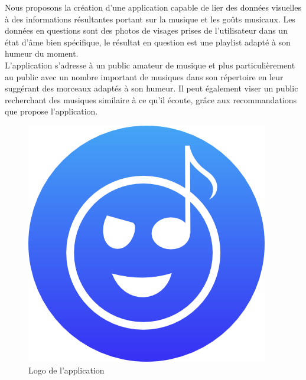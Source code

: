 Nous proposons la création d’une application capable de lier des données visuelles à des informations résultantes portant sur la musique et les goûts musicaux.
Les données en questions sont des photos de visages prises de l’utilisateur dans un état d’âme bien spécifique, le résultat en question est une playlist adapté à son humeur du moment.\\

L’application s’adresse à un public amateur de musique et plus particulièrement au public avec un nombre important de musiques dans son répertoire en leur suggérant des morceaux adaptés à son humeur.
Il peut également viser un public recherchant des musiques similaire à ce qu’il écoute, grâce aux recommandations que propose l’application.

\begin{figure}[htp]
	\centering
	\includegraphics[scale=3.00]{images/logo2.png}
	\caption{Logo de l'application}
\end{figure}